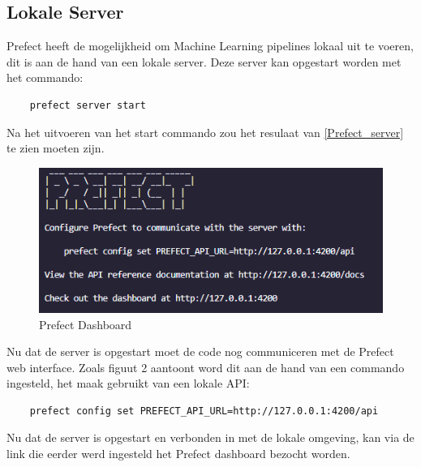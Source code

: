 \subsection{Lokale Server}
Prefect heeft de mogelijkheid om Machine Learning pipelines lokaal uit te voeren, dit is aan de hand van een lokale server. 
Deze server kan opgestart worden met het commando: 
\begin{verbatim}
    prefect server start
\end{verbatim}
Na het uitvoeren van het start commando zou het resulaat van \ref{Prefect_server} te zien moeten zijn.
\begin{figure}[]
    \includegraphics[width=\linewidth]{graphics/Prefect_server.PNG}
    \caption{Prefect Dashboard}
    \label{fig:Prefect_server}
\end{figure}
Nu dat de server is opgestart moet de code nog communiceren met de Prefect web interface. 
Zoals figuut 2 aantoont word dit aan de hand van een commando ingesteld, het maak gebruikt van een lokale API:
\begin{verbatim}
    prefect config set PREFECT_API_URL=http://127.0.0.1:4200/api
\end{verbatim}
Nu dat de server is opgestart en verbonden in met de lokale omgeving, kan via de link die eerder werd ingesteld het Prefect dashboard bezocht worden.
